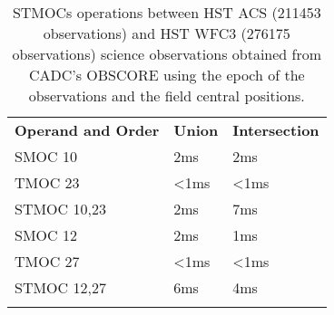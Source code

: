\begin{table}[!htbp]
\begin{center}
{\scriptsize
\begin{tabular}{p{}p{}p{}}
\sptablerule
\textbf{Operand and Order} & \textbf{Union} & \textbf{Intersection} \\
\sptablerule
SMOC 10	&2ms&	2ms \\
TMOC 23&	<1ms&	<1ms \\
STMOC 10,23&	2ms&	7ms \\
SMOC 12&	2ms&	1ms \\
TMOC 27&	<1ms&	<1ms \\
STMOC 12,27&	6ms&	4ms \\
\sptablerule
\end{tabular}
\caption[STMOC operation performances]{STMOCs operations between HST ACS (211453 observations) and HST WFC3 (276175 observations) science observations obtained from CADC's OBSCORE using the epoch of the observations and the field central positions.}
\normalsize
}
\label{table:tmocsizeacs}
\end{center}
\end{table}
